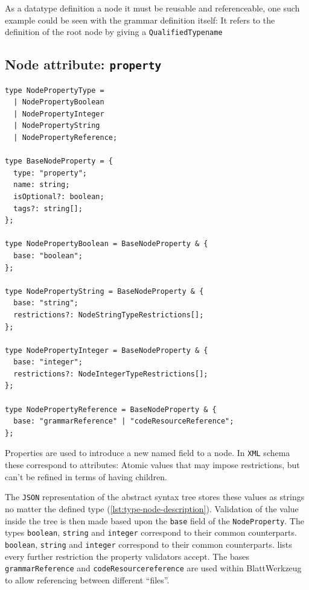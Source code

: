\documentclass[]{report}
\begin{document}
As a datatype definition a node it must be reusable and referenceable, one such example could be seen with the grammar definition itself: It refers to the definition of the root node by giving a \texttt{QualifiedTypename}


\subsection{Node attribute: \texttt{property}}

\begin{listing}[H]
\begin{verbatim}
type NodePropertyType =
  | NodePropertyBoolean
  | NodePropertyInteger
  | NodePropertyString
  | NodePropertyReference;

type BaseNodeProperty = {
  type: "property";
  name: string;
  isOptional?: boolean;
  tags?: string[];
};

type NodePropertyBoolean = BaseNodeProperty & {
  base: "boolean";
};

type NodePropertyString = BaseNodeProperty & {
  base: "string";
  restrictions?: NodeStringTypeRestrictions[];
};

type NodePropertyInteger = BaseNodeProperty & {
  base: "integer";
  restrictions?: NodeIntegerTypeRestrictions[];
};

type NodePropertyReference = BaseNodeProperty & {
  base: "grammarReference" | "codeResourceReference";
};
\end{verbatim}
\caption{Type definition of \texttt{property} specification}
\label{lst:grammar-property-description}
\end{listing}

Properties are used to introduce a new named field to a node. In \texttt{XML} schema these correspond to attributes: Atomic values that may impose restrictions, but can't be refined in terms of having children\cite[§3.2 - Attributes]{W3CXMLSchema}.

The \texttt{JSON} representation of the abstract syntax  tree stores these values as strings no matter the defined type (\cref{lst:type-node-description}). Validation of the value inside the tree is then made based upon the \texttt{base} field of the \texttt{NodeProperty}. The types \texttt{boolean}, \texttt{string} and \texttt{integer} correspond to their common counterparts. \texttt{boolean}, \texttt{string} and \texttt{integer} correspond to their common counterparts.  lists every further restriction the property validators accept. The bases \texttt{grammarReference} and \texttt{codeResourcereference} are used within Blatt\-Werkzeug to allow referencing between different \enquote{files}.
\end{document}
